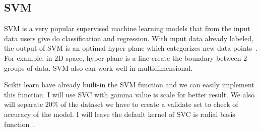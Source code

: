     
    \subsection{SVM}
    
     SVM is a very popular supervised machine learning models that from the input data users give do classification and regression. With input data already labeled, the output of SVM is an optimal hyper plane which categorizes new data points~\cite{GG}. For example, in 2D space, hyper plane is a line create the boundary between 2 groups of data. SVM also can work well in multidimensional. 
    
    Scikit learn have already built-in the SVM function and we can easily implement this function. I will use SVC with gamma value is scale for better result. We also will separate 20\% of the dataset we have to create a validate set to check of accuracy of the model. I will leave the default kernel of SVC is radial basis function~\cite{GGG}.